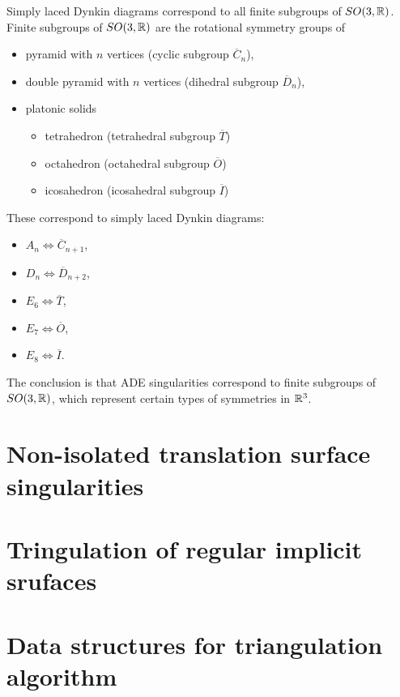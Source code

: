 Simply laced Dynkin diagrams correspond to all finite subgroups of
$SO(3,\mathbb{R})$. Finite subgroups of
$SO(3,\mathbb{R})$ are the rotational symmetry groups of
\begin{itemize}
    \item pyramid with $n$ vertices (cyclic subgroup $\overline{C}_n$),
    \item double pyramid with $n$ vertices (dihedral subgroup $\overline{D}_n$),
    \item platonic solids
    \begin{itemize}
        \item tetrahedron (tetrahedral subgroup $\overline{T}$)
        \item octahedron (octahedral subgroup $\overline{O}$)
        \item icosahedron (icosahedral subgroup $\overline{I}$)
    \end{itemize}
\end{itemize}

These correspond to simply laced Dynkin diagrams:
\begin{itemize}
    \item $A_n \iff \overline{C}_{n+1}$,
    \item $D_n \iff \overline{D}_{n+2}$,
    \item $E_6 \iff \overline{T}$,
    \item $E_7 \iff \overline{O}$,
    \item $E_8 \iff \overline{I}$.
\end{itemize}

The conclusion is that ADE singularities correspond to finite subgroups of
$SO(3, \mathbb{R})$, which represent certain types of symmetries in $\mathbb{R}^3$.

\section{Non-isolated translation surface singularities}
\label{sub2.3}

\section{Tringulation of regular implicit srufaces}
\label{sub2.4}

\section{Data structures for triangulation algorithm}
\label{sub2.5}
